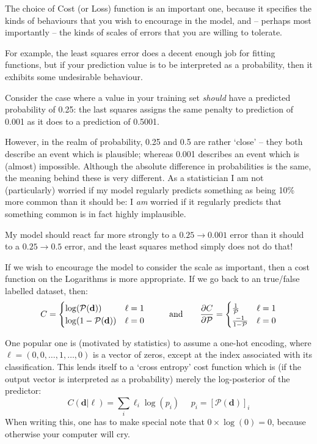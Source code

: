 \documentclass[a4paper,openany,11pt]{book}
\renewcommand\vec[1]{\boldsymbol{\mathbf{#1}}}
\begin{document}
				The choice of Cost (or Loss) function is an important one, because it specifies the kinds of behaviours that you wish to encourage in the model, and -- perhaps most importantly -- the kinds of scales of errors that you are willing to tolerate. 

				For example, the least squares error does a decent enough job for fitting functions, but if your prediction value is to be interpreted as a probability, then it exhibits some undesirable behaviour. 
				
				Consider the case where a value in your training set \textit{should} have a predicted probability of 0.25: the last squares assigns the same penalty to prediction of 0.001 as it does to a prediction of 0.5001.

				However, in the realm of probability, 0.25 and 0.5 are rather `close' -- they both describe an event which is plausible; whereas 0.001 describes an event which is (almost) impossible. Although the absolute difference in probabilities is the same, the meaning behind these is very different. As a statistician I am not (particularly) worried if my model regularly predicts something as being 10\% more common than it should be: I \textit{am} worried if it regularly predicts that something common is in fact highly implausible.

				My model should react far more strongly to a $0.25 \to 0.001$ error than it should to a $0.25 \to 0.5$ error, and the least squares method simply does not do that!

				If we wish to encourage the model to consider the scale as important, then a cost function on the Logarithms is more appropriate. If we go back to an true/false labelled dataset, then:
				\begin{equation}
					C = \begin{cases} \log(\mathcal{P}(\vec{d})) & \ell = 1
						\\
						\log(1 - \mathcal{P}(\vec{d})) & \ell = 0
					\end{cases} ~~~~~~~~\text{and} ~~~~~~ \pdiv{C}{\mathcal{P}} = \begin{cases} \frac{1}{\mathcal{{P}}} & \ell = 1
						\\
						\frac{-1}{1 - \mathcal{P}} & \ell = 0\end{cases}
				\end{equation}


				One popular one is (motivated by statistics) to assume a one-hot encoding, where $\vec{\ell} = (0,0,\hdots,1,\hdots,0)$ is a vector of zeros, except at the index associated with its classification. This lends itself to a `cross entropy' cost function which is (if the output vector is interpreted as a probability) merely the log-posterior of the predictor:
				\begin{equation}
					C(\vec{d}|\vec{\ell}) = \sum_i \ell_i \log(p_i)~~~~~~ p_i = \left[ \mathcal{P}(\vec{d}) \right]_i
				\end{equation} 
				When writing this, one has to make special note that $0 \times \log(0) = 0$, because otherwise your computer will cry.
\end{document}
